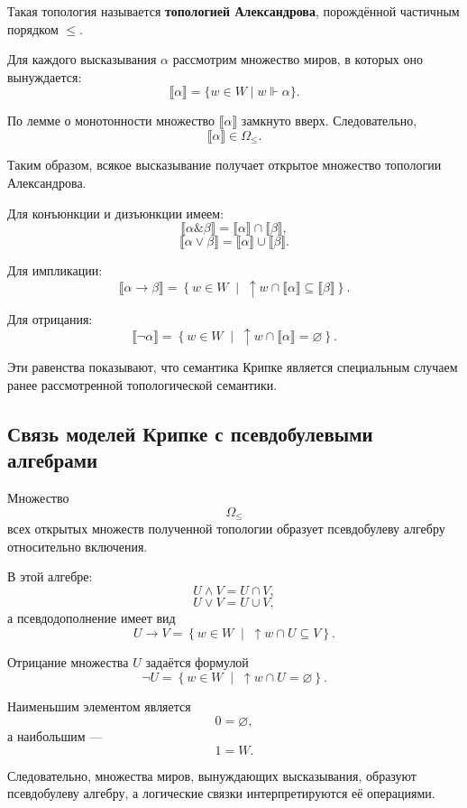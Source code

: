 \documentclass[12pt,a4paper,oneside,openany]{book}
\theoremstyle{definition}
\theoremstyle{plain}
\theoremstyle{remark}
\begin{document}
Такая топология называется \textbf{топологией Александрова},
порождённой частичным порядком \(\leqslant\).

Для каждого высказывания \(\alpha\) рассмотрим множество миров, в
которых оно вынуждается:
\[
\llbracket\alpha\rrbracket
=
\{w\in W\mid w\Vdash\alpha\}.
\]

По лемме о монотонности множество
\(\llbracket\alpha\rrbracket\) замкнуто вверх. Следовательно,
\[
\llbracket\alpha\rrbracket
\in
\Omega_{\leqslant}.
\]

Таким образом, всякое высказывание получает открытое множество
топологии Александрова.

Для конъюнкции и дизъюнкции имеем:
\[
\llbracket\alpha\mathbin{\&}\beta\rrbracket
=
\llbracket\alpha\rrbracket
\cap
\llbracket\beta\rrbracket,
\]
\[
\llbracket\alpha\lor\beta\rrbracket
=
\llbracket\alpha\rrbracket
\cup
\llbracket\beta\rrbracket.
\]

Для импликации:
\[
\llbracket\alpha\to\beta\rrbracket
=
\left\{
w\in W
\;\middle|\;
{\uparrow}w\cap
\llbracket\alpha\rrbracket
\subseteq
\llbracket\beta\rrbracket
\right\}.
\]

Для отрицания:
\[
\llbracket\neg\alpha\rrbracket
=
\left\{
w\in W
\;\middle|\;
{\uparrow}w\cap
\llbracket\alpha\rrbracket
=
\varnothing
\right\}.
\]

Эти равенства показывают, что семантика Крипке является специальным
случаем ранее рассмотренной топологической семантики.

\subsection{Связь моделей Крипке с псевдобулевыми алгебрами}

Множество
\[
\Omega_{\leqslant}
\]
всех открытых множеств полученной топологии образует псевдобулеву
алгебру относительно включения.

В этой алгебре:
\[
U\wedge V=U\cap V,
\]
\[
U\vee V=U\cup V,
\]
а псевдодополнение имеет вид
\[
U\to V
=
\left\{
w\in W
\;\middle|\;
{\uparrow}w\cap U\subseteq V
\right\}.
\]

Отрицание множества \(U\) задаётся формулой
\[
\neg U
=
\left\{
w\in W
\;\middle|\;
{\uparrow}w\cap U=\varnothing
\right\}.
\]

Наименьшим элементом является
\[
0=\varnothing,
\]
а наибольшим ---
\[
1=W.
\]

Следовательно, множества миров, вынуждающих высказывания, образуют
псевдобулеву алгебру, а логические связки интерпретируются её
операциями.
\end{document}
